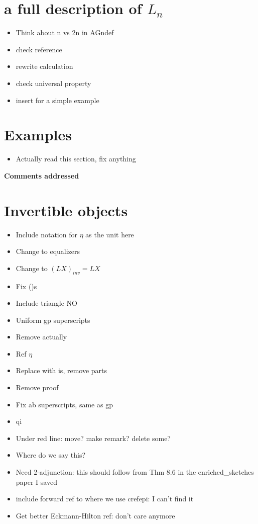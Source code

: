 \documentclass{amsart}
\begin{document}
\section{a full description of $L_n $}

\begin{itemize}


\item Think about n vs 2n in {AGndef}
\item check reference
\item rewrite calculation
\item check universal property
\item insert for a simple example
\end{itemize}



\section{ Examples}

\begin{itemize}
\item Actually read this section, fix anything
\end{itemize}
\newpage

\begin{center}
\begin{Large}
\textbf{Comments addressed}
\end{Large}
\end{center}
\vskip1cm


\section{ Invertible objects}
\begin{itemize}
\item Include notation for $\eta$ as the unit here
\item Change to equalizers
\item Change to $(LX)_{inv} = LX$
\item Fix ()s
\item Include triangle NO
\item Uniform gp superscripts
\item Remove actually
\item Ref $\eta$
\item Replace with is, remove parts
\item Remove proof
\item Fix ab superscripts, same as gp
\item qi
\item Under red line: move? make remark? delete some?
\item Where do we say this?
\item Need 2-adjunction: this should follow from Thm 8.6 in the enriched\_sketches paper I saved
\item include forward ref to where we use cref{epi}: I can't find it
\item Get better Eckmann-Hilton ref: don't care anymore
\end{itemize}
\end{document}
